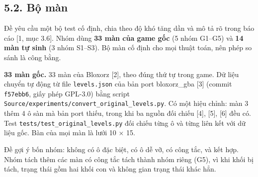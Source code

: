 \subsection{5.2. Bộ màn}

Đề yêu cầu một bộ test cố định, chia theo độ khó tăng dần và mô tả rõ trong báo cáo {[}1, mục 3.6{]}. Nhóm dùng \textbf{33 màn của game gốc} (5 nhóm G1--G5) và \textbf{14 màn tự sinh} (3 nhóm S1--S3). Bộ màn cố định cho mọi thuật toán, nên phép so sánh là công bằng.

\textbf{33 màn gốc.} 33 màn của Bloxorz {[}2{]}, theo đúng thứ tự trong game. Dữ liệu chuyển tự động từ file \texttt{levels.\allowbreak{}json} của bản port bloxorz\_gba {[}3{]} (commit \texttt{f57ebb6}, giấy phép GPL-3.0) bằng script \texttt{Source/\allowbreak{}experiments/\allowbreak{}convert\_\allowbreak{}original\_\allowbreak{}levels.\allowbreak{}py}. Có một hiệu chỉnh: màn 3 thêm 4 ô sàn mà bản port thiếu, trong khi ba nguồn đối chiếu {[}4{]}, {[}5{]}, {[}6{]} đều có. Test \texttt{tests/\allowbreak{}test\_\allowbreak{}original\_\allowbreak{}levels.\allowbreak{}py} đối chiếu từng ô và từng liên kết với dữ liệu gốc. Bàn của mọi màn là lưới 10 × 15.

Đề gợi ý bốn nhóm: không có ô đặc biệt, có ô dễ vỡ, có công tắc, và kết hợp. Nhóm tách thêm các màn có công tắc tách thành nhóm riêng (G5), vì khi khối bị tách, trạng thái gồm hai khối con và không gian trạng thái khác hẳn.


